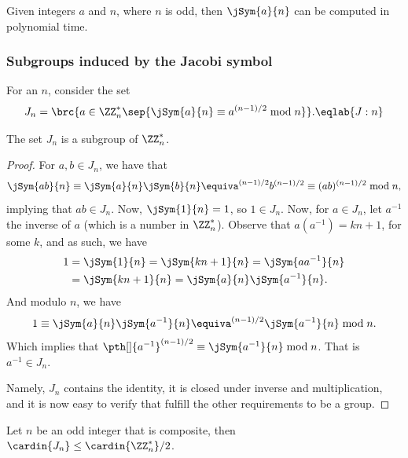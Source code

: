 \begin{lemma}
    Given integers $a$ and $n$, where $n$ is odd, then $\jSym{a}{n}$
    can be computed in polynomial time.
\end{lemma}

\subsubsection{Subgroups induced by the Jacobi symbol}

For an $n$, consider the set 
\begin{align}
    J_n =\brc{a \in \ZZ_n^* \sep{ \jSym{a}{n} \equiv a^{(n-1)/2}
          \bmod{n}}}.%
    \eqlab{J:n}%
\end{align}

\begin{claim}
    The set $J_n$ is a subgroup of $\ZZ_n^*$.
\end{claim}
\begin{proof}
    For $a, b \in J_n$, we have that 
    \[
        \jSym{a b}{n}%
        \equiv%
        \jSym{a}{n} \jSym{b}{n}%
        \equiv%
        a^{(n-1)/2} b^{(n-1)/2}%
        \equiv%
        (ab)^{(n-1)/2} \bmod{n},
    \]
    implying that $ab \in J_n$. Now, $\jSym{1}{n} = 1$, so $1 \in
    J_n$.  Now, for $a \in J_n$, let $a^{-1}$ the inverse of $a$
    (which is a number in $\ZZ_n^*$). Observe that $a (a^{-1}) = k n + 1$, for
    some $k$, and as such, 
    we have
    \begin{align*}
        1%
        &=%
        \jSym{1}{n}%
        =%
        \jSym{kn + 1}{n}%
        =%
        \jSym{a {} a^{-1}}{n}\\
        &=%
        \jSym{kn + 1}{n}%
        =%
        \jSym{a }{n} %
        \jSym{ a^{-1}}{n}. %
    \end{align*}
    And modulo $n$, we have 
    \begin{align*}
        1%
        \equiv%
        \jSym{a }{n} %
        \jSym{ a^{-1}}{n} %
        \equiv%
        a^{(n-1)/2} \jSym{ a^{-1}}{n} \bmod{n}. %
    \end{align*}
    Which implies that $\pth[]{a^{-1}}^{(n-1)/2} \equiv \jSym{
       a^{-1}}{n} \bmod{n}$. That is $a^{-1} \in J_n$.

    Namely, $J_n$ contains the identity, it is closed under inverse
    and multiplication, and it is now easy to verify that fulfill the
    other requirements to be a group.
\end{proof}

\begin{lemma}
    Let $n$ be an odd integer that is composite, then
    $\cardin{J_n} \leq \cardin{\ZZ_n^*}/2$.
\end{lemma}

